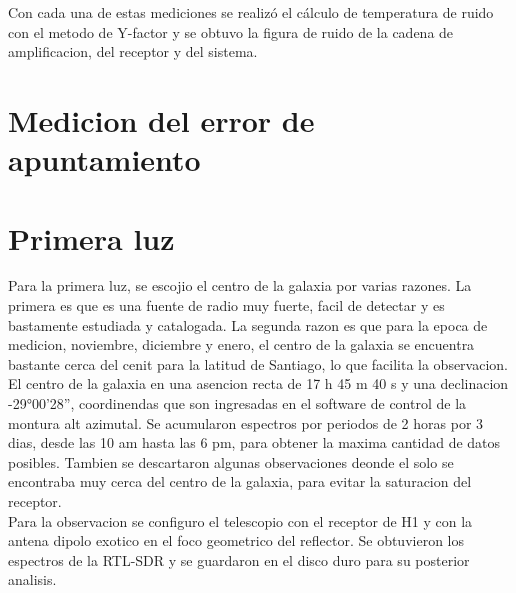 Con cada una de estas mediciones se realizó el cálculo de temperatura de ruido con el metodo de Y-factor y se obtuvo la figura de ruido de la cadena de amplificacion, del receptor y del sistema.\\


\section{Medicion del error de apuntamiento}

\section{Primera luz}

Para la primera luz, se escojio el centro de la galaxia por varias razones. La primera es que es una fuente de radio muy fuerte, facil de detectar y es bastamente estudiada y catalogada. La segunda razon es que para la epoca de medicion, noviembre, diciembre y enero, el centro de la galaxia se encuentra bastante cerca del cenit para la latitud de Santiago, lo que facilita la observacion.\\

El centro de la galaxia en una asencion recta de 17 h 45 m 40 s y una declinacion -29°00'28'', coordinendas que son ingresadas en el software de control de la montura alt azimutal. Se acumularon espectros por periodos de 2 horas por 3 dias, desde las 10 am hasta las 6 pm, para obtener la maxima cantidad de datos posibles. Tambien se descartaron algunas observaciones deonde el solo se encontraba muy cerca del centro de la galaxia, para evitar la saturacion del receptor.\\

Para la observacion se configuro el telescopio con el receptor de H1 y con la antena dipolo exotico en el foco geometrico del reflector. Se obtuvieron los espectros de la RTL-SDR y se guardaron en el disco duro para su posterior analisis.\\